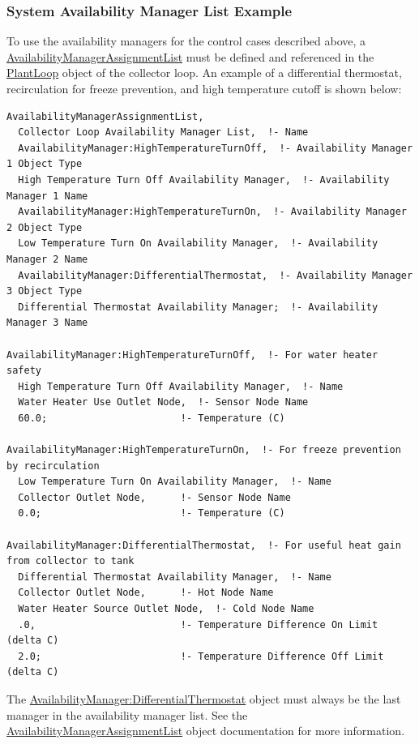 \subsubsection{System Availability Manager List Example}\label{system-availability-manager-list-example}

To use the availability managers for the control cases described above, a \hyperref[availabilitymanagerassignmentlist]{AvailabilityManagerAssignmentList} must be defined and referenced in the \hyperref[plantloop]{PlantLoop} object of the collector loop. An example of a differential thermostat, recirculation for freeze prevention, and high temperature cutoff is shown below:

\begin{lstlisting}
AvailabilityManagerAssignmentList,
  Collector Loop Availability Manager List,  !- Name
  AvailabilityManager:HighTemperatureTurnOff,  !- Availability Manager 1 Object Type
  High Temperature Turn Off Availability Manager,  !- Availability Manager 1 Name
  AvailabilityManager:HighTemperatureTurnOn,  !- Availability Manager 2 Object Type
  Low Temperature Turn On Availability Manager,  !- Availability Manager 2 Name
  AvailabilityManager:DifferentialThermostat,  !- Availability Manager 3 Object Type
  Differential Thermostat Availability Manager;  !- Availability Manager 3 Name

AvailabilityManager:HighTemperatureTurnOff,  !- For water heater safety
  High Temperature Turn Off Availability Manager,  !- Name
  Water Heater Use Outlet Node,  !- Sensor Node Name
  60.0;                       !- Temperature (C)

AvailabilityManager:HighTemperatureTurnOn,  !- For freeze prevention by recirculation
  Low Temperature Turn On Availability Manager,  !- Name
  Collector Outlet Node,      !- Sensor Node Name
  0.0;                        !- Temperature (C)

AvailabilityManager:DifferentialThermostat,  !- For useful heat gain from collector to tank
  Differential Thermostat Availability Manager,  !- Name
  Collector Outlet Node,      !- Hot Node Name
  Water Heater Source Outlet Node,  !- Cold Node Name
  .0,                         !- Temperature Difference On Limit (delta C)
  2.0;                        !- Temperature Difference Off Limit (delta C)
\end{lstlisting}

The \hyperref[availabilitymanagerdifferentialthermostat]{AvailabilityManager:DifferentialThermostat} object must always be the last manager in the availability manager list. See the \hyperref[availabilitymanagerassignmentlist]{AvailabilityManagerAssignmentList} object documentation for more information.

